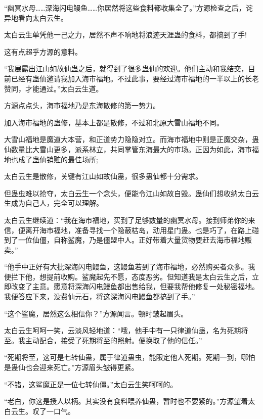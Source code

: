 
\begin{this_body}

“幽冥水母……深海闪电鳗鱼……你居然将这些食料都收集全了。”方源检查之后，诧异地看向太白云生。

太白云生单凭他一己之力，居然不声不响地将浪迹天涯蛊的食料，都搞到了手!

这有点超乎方源的意料。

“我展露出江山如故仙蛊之后，就得到了很多蛊仙的欢迎。他们主动和我结交，目前已经有蛊仙邀请我加入海市福地。不过此事，要经过海市福地的一半以上的长老赞同，才能通过。”太白云生道。

方源点点头，海市福地乃是东海散修的第一势力。

加入海市福地的蛊修，基本上都是散修，不过和北原大雪山福地不同。

大雪山福地是魔道大本营，和正道势力隐隐对立。而海市福地中则是正魔交杂，蛊仙数量比大雪山更多，派系林立，共同掌管东海最大的市场。正因为如此，海市福地也成了蛊仙销赃的最佳场所;

太白云生是散修，关键有江山如故仙蛊，很多蛊仙都十分需求。

但蛊虫难以抢夺，太白云生一个念头，便能令江山如故自毁。蛊仙们想收纳太白云生成为自己人，完全可以理解。

太白云生继续道：“我在海市福地，买到了足够数量的幽冥水母。接到师弟你的来信，便离开海市福地，准备寻找一个隐蔽枯岛，动用星门蛊。也是巧了，在路上碰到了一位仙僵，自称鲨魔，乃是僵盟中人。正好带着大量货物要赶去海市福地贩卖。”

“他手中正好有大批深海闪电鳗鱼，这鳗鱼若到了海市福地，必然购买者众多。我便拦下他，想提前收购。鲨魔起先不愿，态度恶劣。但知道我是太白云生之后，立即改变了主意。愿意将深海闪电鳗鱼都出售给我，但要我帮他修复一处秘密福地。我便答应下来，没费仙元石，将这深海闪电鳗鱼都搞到了手。”

“这个鲨魔，居然这么相信你？”方源闻言。顿时皱起眉头。

太白云生呵呵一笑，云淡风轻地道：“哦，他手中有一只律道仙蛊，名为死期将至。我主动配合，接受了死期将至的照射。便换取了他的信任。”

“死期将至，这可是七转仙蛊，属于律道蛊虫，能限定他人死期。死期一到，哪怕是蛊仙也会迎来死亡。”方源眉头皱得更紧。

“不错，这鲨魔正是一位七转仙僵。”太白云生笑呵呵的。

“老白，你这是授人以柄。其实没有食料喂养仙蛊，暂时也不要紧的。”方源望着太白云生。叹了一口气。


\end{this_body}
